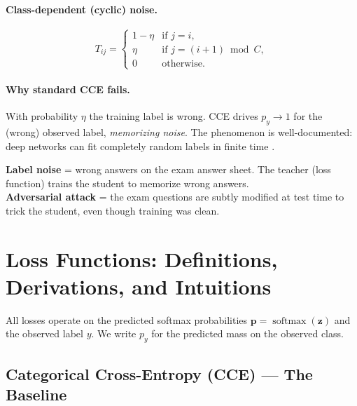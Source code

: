 \documentclass[11pt,a4paper]{article}
\newcommand{\softmax}{\operatorname{softmax}}
\newcommand{\py}{p_y}
\newcommand{\pb}{\mathbf{p}}
\newcommand{\zb}{\mathbf{z}}
\begin{document}
\paragraph{Class-dependent (cyclic) noise.}
\[
  T_{ij} = \begin{cases} 1 - \eta & \text{if } j = i, \\ \eta & \text{if } j = (i+1)\bmod C, \\ 0 & \text{otherwise.} \end{cases}
\]

\paragraph{Why standard CCE fails.}
With probability $\eta$ the training label is wrong. CCE drives $\py \to 1$
for the (wrong) observed label, \emph{memorizing noise}. The phenomenon is
well-documented: deep networks can fit completely random labels in finite time
\cite{zhang2018gce}.

\begin{tcolorbox}[colback=orange!5!white,colframe=orange!60!black,title=Intuition: Label Noise vs Adversarial]
\textbf{Label noise} = wrong answers on the exam answer sheet. The teacher
(loss function) trains the student to memorize wrong answers. \\
\textbf{Adversarial attack} = the exam questions are subtly modified at test time to
trick the student, even though training was clean.
\end{tcolorbox}

\section{Loss Functions: Definitions, Derivations, and Intuitions}
\label{sec:losses}

All losses operate on the predicted softmax probabilities $\pb = \softmax(\zb)$ and
the observed label $y$. We write $p_y$ for the predicted mass on the observed class.

\subsection{Categorical Cross-Entropy (CCE) — The Baseline}
\label{sec:cce}
\end{document}
